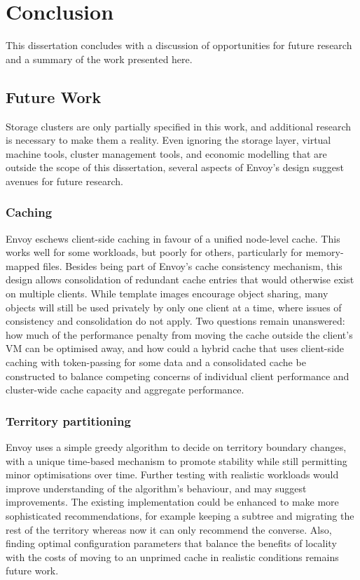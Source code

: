 \chapter{Conclusion}\label{cha:conclusion}

This dissertation concludes with a discussion of opportunities for future research and a summary of the work presented here.

\section{Future Work}

Storage clusters are only partially specified in this work, and additional research is necessary to make them a reality. Even ignoring the storage layer, virtual machine tools, cluster management tools, and economic modelling that are outside the scope of this dissertation, several aspects of Envoy's design suggest avenues for future research.

\subsection{Caching}

Envoy eschews client-side caching in favour of a unified node-level cache. This works well for some workloads, but poorly for others, particularly for memory-mapped files. Besides being part of Envoy's cache consistency mechanism, this design allows consolidation of redundant cache entries that would otherwise exist on multiple clients. While template images encourage object sharing, many objects will still be used privately by only one client at a time, where issues of consistency and consolidation do not apply. Two questions remain unanswered: how much of the performance penalty from moving the cache outside the client's VM can be optimised away, and how could a hybrid cache that uses client-side caching with token-passing for some data and a consolidated cache be constructed to balance competing concerns of individual client performance and cluster-wide cache capacity and aggregate performance.

\subsection{Territory partitioning}

Envoy uses a simple greedy algorithm to decide on territory boundary changes, with a unique time-based mechanism to promote stability while still permitting minor optimisations over time. Further testing with realistic workloads would improve understanding of the algorithm's behaviour, and may suggest improvements. The existing implementation could be enhanced to make more sophisticated recommendations, for example keeping a subtree and migrating the rest of the territory whereas now it can only recommend the converse. Also, finding optimal configuration parameters that balance the benefits of locality with the costs of moving to an unprimed cache in realistic conditions remains future work.

